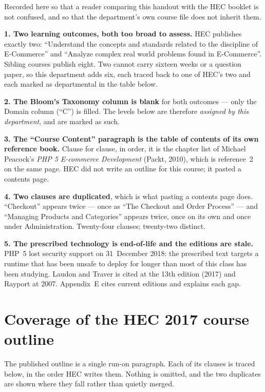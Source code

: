\begin{alertbox}
Recorded here so that a reader comparing this handout with the HEC booklet is
not confused, and so that the department's own course file does not inherit
them.

\smallskip
\textbf{1. Two learning outcomes, both too broad to assess.} HEC publishes
exactly two: ``Understand the concepts and standards related to the discipline
of E-Commerce'' and ``Analyze complex real world problems found in E-Commerce''.
Sibling courses publish eight. Two cannot carry sixteen weeks or a question
paper, so this department adds six, each traced back to one of HEC's two and
each marked as departmental in the table below.

\smallskip
\textbf{2. The Bloom's Taxonomy column is blank} for both outcomes --- only the
Domain column (``C'') is filled. The levels below are therefore
\emph{assigned by this department}, and are marked as such.

\smallskip
\textbf{3. The ``Course Content'' paragraph is the table of contents of its own
reference book.} Clause for clause, in order, it is the chapter list of
Michael Peacock's \emph{PHP 5 E-commerce Development} (Packt, 2010), which is
reference~2 on the same page. HEC did not write an outline for this course; it
pasted a contents page.

\smallskip
\textbf{4. Two clauses are duplicated}, which is what pasting a contents page
does. ``Checkout'' appears twice --- once as ``The Checkout and Order Process''
--- and ``Managing Products and Categories'' appears twice, once on its own and
once under Administration. Twenty-four clauses; twenty-two distinct.

\smallskip
\textbf{5. The prescribed technology is end-of-life and the editions are stale.}
PHP~5 lost security support on 31~December 2018: the prescribed text targets a
runtime that has been unsafe to deploy for longer than most of this class has
been studying. Laudon and Traver is cited at the 13th edition (2017) and Rayport
at 2007. Appendix~E cites current editions and explains each gap.
\end{alertbox}

\section*{Coverage of the HEC 2017 course outline}

The published outline is a single run-on paragraph. Each of its clauses is
traced below, in the order HEC writes them. Nothing is omitted, and the two
duplicates are shown where they fall rather than quietly merged.

